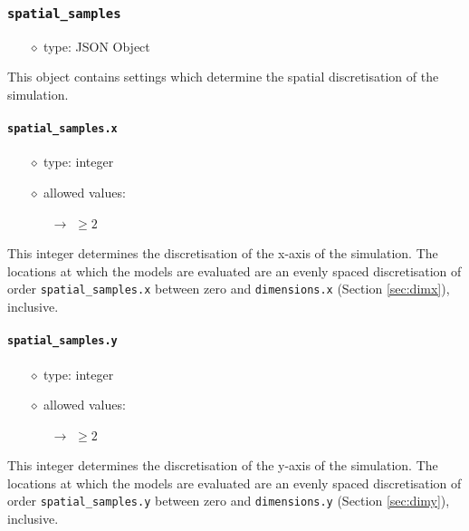 \documentclass[]{article}
\def\code#1{\texttt{#1}}
\begin{document}
\subsubsection{\code{spatial\_samples}}
\begin{itemize}
    \item[$\diamond$] type: JSON Object 
\end{itemize}
This object contains settings which determine the spatial discretisation of the
simulation.

\paragraph{\code{spatial\_samples.x}}
\begin{itemize}
    \item[$\diamond$] type: integer 
    \item[$\diamond$] allowed values:
    \begin{itemize}
        \item[$\rightarrow$] $\geq2$
    \end{itemize}
\end{itemize}
This integer determines the discretisation of the x-axis of the simulation. The
locations at which the models are evaluated are an evenly spaced discretisation
of order \code{spatial\_samples.x} between zero and \code{dimensions.x} (Section
\ref{sec:dimx}), inclusive.


\paragraph{\code{spatial\_samples.y}}
\begin{itemize}
    \item[$\diamond$] type: integer 
    \item[$\diamond$] allowed values:
    \begin{itemize}
        \item[$\rightarrow$] $\geq2$
    \end{itemize}
\end{itemize}
This integer determines the discretisation of the y-axis of the simulation. The
locations at which the models are evaluated are an evenly spaced discretisation
of order \code{spatial\_samples.y} between zero and \code{dimensions.y} (Section
\ref{sec:dimy}), inclusive.
\end{document}
